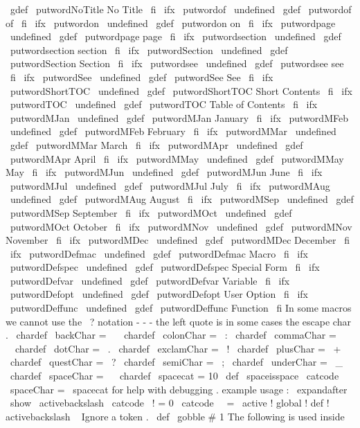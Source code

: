 \
gdef
\
putwordNoTitle
{
No
Title
}
\
fi
\
ifx
\
putwordof
\
undefined
\
gdef
\
putwordof
{
of
}
\
fi
\
ifx
\
putwordon
\
undefined
\
gdef
\
putwordon
{
on
}
\
fi
\
ifx
\
putwordpage
\
undefined
\
gdef
\
putwordpage
{
page
}
\
fi
\
ifx
\
putwordsection
\
undefined
\
gdef
\
putwordsection
{
section
}
\
fi
\
ifx
\
putwordSection
\
undefined
\
gdef
\
putwordSection
{
Section
}
\
fi
\
ifx
\
putwordsee
\
undefined
\
gdef
\
putwordsee
{
see
}
\
fi
\
ifx
\
putwordSee
\
undefined
\
gdef
\
putwordSee
{
See
}
\
fi
\
ifx
\
putwordShortTOC
\
undefined
\
gdef
\
putwordShortTOC
{
Short
Contents
}
\
fi
\
ifx
\
putwordTOC
\
undefined
\
gdef
\
putwordTOC
{
Table
of
Contents
}
\
fi
%
\
ifx
\
putwordMJan
\
undefined
\
gdef
\
putwordMJan
{
January
}
\
fi
\
ifx
\
putwordMFeb
\
undefined
\
gdef
\
putwordMFeb
{
February
}
\
fi
\
ifx
\
putwordMMar
\
undefined
\
gdef
\
putwordMMar
{
March
}
\
fi
\
ifx
\
putwordMApr
\
undefined
\
gdef
\
putwordMApr
{
April
}
\
fi
\
ifx
\
putwordMMay
\
undefined
\
gdef
\
putwordMMay
{
May
}
\
fi
\
ifx
\
putwordMJun
\
undefined
\
gdef
\
putwordMJun
{
June
}
\
fi
\
ifx
\
putwordMJul
\
undefined
\
gdef
\
putwordMJul
{
July
}
\
fi
\
ifx
\
putwordMAug
\
undefined
\
gdef
\
putwordMAug
{
August
}
\
fi
\
ifx
\
putwordMSep
\
undefined
\
gdef
\
putwordMSep
{
September
}
\
fi
\
ifx
\
putwordMOct
\
undefined
\
gdef
\
putwordMOct
{
October
}
\
fi
\
ifx
\
putwordMNov
\
undefined
\
gdef
\
putwordMNov
{
November
}
\
fi
\
ifx
\
putwordMDec
\
undefined
\
gdef
\
putwordMDec
{
December
}
\
fi
%
\
ifx
\
putwordDefmac
\
undefined
\
gdef
\
putwordDefmac
{
Macro
}
\
fi
\
ifx
\
putwordDefspec
\
undefined
\
gdef
\
putwordDefspec
{
Special
Form
}
\
fi
\
ifx
\
putwordDefvar
\
undefined
\
gdef
\
putwordDefvar
{
Variable
}
\
fi
\
ifx
\
putwordDefopt
\
undefined
\
gdef
\
putwordDefopt
{
User
Option
}
\
fi
\
ifx
\
putwordDeffunc
\
undefined
\
gdef
\
putwordDeffunc
{
Function
}
\
fi
%
In
some
macros
we
cannot
use
the
\
?
notation
-
-
-
the
left
quote
is
%
in
some
cases
the
escape
char
.
\
chardef
\
backChar
=
\
\
\
chardef
\
colonChar
=
\
:
\
chardef
\
commaChar
=
\
\
chardef
\
dotChar
=
\
.
\
chardef
\
exclamChar
=
\
!
\
chardef
\
plusChar
=
\
+
\
chardef
\
questChar
=
\
?
\
chardef
\
semiChar
=
\
;
\
chardef
\
underChar
=
\
_
\
chardef
\
spaceChar
=
\
%
\
chardef
\
spacecat
=
10
\
def
\
spaceisspace
{
\
catcode
\
spaceChar
=
\
spacecat
}
{
%
for
help
with
debugging
.
%
example
usage
:
\
expandafter
\
show
\
activebackslash
\
catcode
\
!
=
0
\
catcode
\
\
=
\
active
!
global
!
def
!
activebackslash
{
\
}
}
%
Ignore
a
token
.
%
\
def
\
gobble
#
1
{
}
%
The
following
is
used
inside
